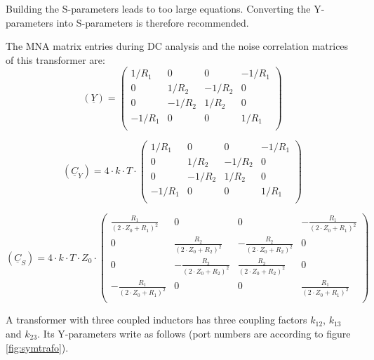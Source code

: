 Building the S-parameters leads to too large equations. Converting
the Y-parameters into S-parameters is therefore recommended.

\addvspace{12pt}

The MNA matrix entries during DC analysis and the noise correlation
matrices of this transformer are:
\begin{equation}
(\underline{Y}) =
\begin{pmatrix}
 1/R_1 & 0 & 0 & -1/R_1 \\
 0 &  1/R_2 & -1/R_2 & 0 \\
 0 & -1/R_2 &  1/R_2 & 0 \\
-1/R_1 & 0 & 0 &  1/R_1 \\
\end{pmatrix}
\end{equation}

\begin{equation}
(\underline{C}_Y) = 4\cdot k\cdot T\cdot
\begin{pmatrix}
 1/R_1 & 0 & 0 & -1/R_1 \\
 0 &  1/R_2 & -1/R_2 & 0 \\
 0 & -1/R_2 &  1/R_2 & 0 \\
-1/R_1 & 0 & 0 &  1/R_1 \\
\end{pmatrix}
\end{equation}

\begin{equation}
(\underline{C}_S) = 4\cdot k\cdot T\cdot Z_0\cdot
\begin{pmatrix}
 \tfrac{R_1}{(2\cdot Z_0 + R_1)^2} & 0 & 0 & -\tfrac{R_1}{(2\cdot Z_0 + R_1)^2} \\
 0 &  \tfrac{R_2}{(2\cdot Z_0 + R_2)^2} & -\tfrac{R_2}{(2\cdot Z_0 + R_2)^2} & 0 \\
 0 & -\tfrac{R_2}{(2\cdot Z_0 + R_2)^2} &  \tfrac{R_2}{(2\cdot Z_0 + R_2)^2} & 0 \\
-\tfrac{R_1}{(2\cdot Z_0 + R_1)^2} & 0 & 0 &  \tfrac{R_1}{(2\cdot Z_0 + R_1)^2} \\
\end{pmatrix}
\end{equation}

\addvspace{12pt}

A transformer with three coupled inductors has three coupling factors
$k_{12}$, $k_{13}$ and $k_{23}$.  Its Y-parameters write as follows
(port numbers are according to figure \ref{fig:symtrafo}).

